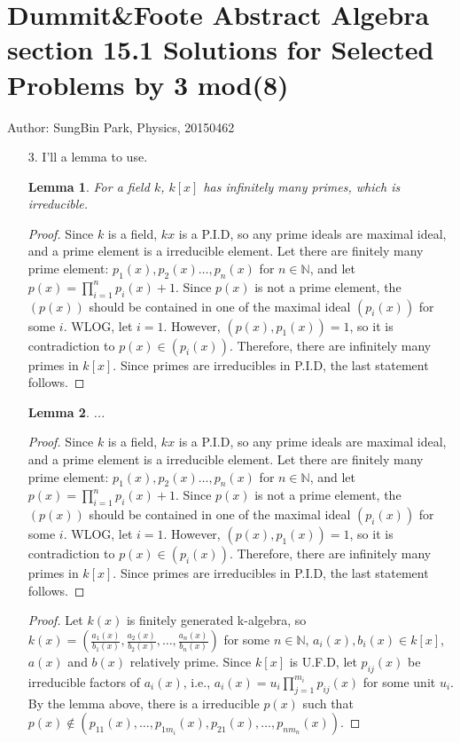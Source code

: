 \documentclass[12pt]{article}
\newtheorem{lemma}{Lemma}
\begin{document}
\section*{Dummit\&Foote Abstract Algebra section 15.1 Solutions for Selected Problems by 3 mod(8)}
Author: SungBin Park, Physics, 20150462
\begin{enumerate}
\item[3.] I'll a lemma to use.
\begin{lemma}
For a field $k$, $k[x]$ has infinitely many primes, which is irreducible.
\end{lemma}
\begin{proof}
Since $k$ is a field, $k{x}$ is a P.I.D, so any prime ideals are maximal ideal, and a prime element is a irreducible element. Let there are finitely many prime element: $p_1(x),p_2(x)\ldots, p_n(x)$ for $n\in \mathbb{N}$, and let $p(x)=\prod_{i=1}^n p_i(x)+1$. Since $p(x)$ is not a prime element, the $(p(x))$ should be contained in one of the maximal ideal $(p_i(x))$ for some $i$. WLOG, let $i=1$. However, $(p(x),p_1(x))=1$, so it is contradiction to $p(x)\in (p_i(x))$. Therefore, there are infinitely many primes in $k[x]$. Since primes are irreducibles in P.I.D, the last statement follows.
\end{proof}
\begin{lemma}
...
\end{lemma}
\begin{proof}
Since $k$ is a field, $k{x}$ is a P.I.D, so any prime ideals are maximal ideal, and a prime element is a irreducible element. Let there are finitely many prime element: $p_1(x),p_2(x)\ldots, p_n(x)$ for $n\in \mathbb{N}$, and let $p(x)=\prod_{i=1}^n p_i(x)+1$. Since $p(x)$ is not a prime element, the $(p(x))$ should be contained in one of the maximal ideal $(p_i(x))$ for some $i$. WLOG, let $i=1$. However, $(p(x),p_1(x))=1$, so it is contradiction to $p(x)\in (p_i(x))$. Therefore, there are infinitely many primes in $k[x]$. Since primes are irreducibles in P.I.D, the last statement follows.
\end{proof}
\begin{proof}
Let $k(x)$ is finitely generated k-algebra, so $k(x)=\left(\frac{a_1(x)}{b_1(x)},\frac{a_2(x)}{b_2(x)},\ldots, \frac{a_n(x)}{b_n(x)}\right)$ for some $n\in \mathbb{N}$, $a_i(x),b_i(x)\in k[x]$, $a(x)$ and $b(x)$ relatively prime. Since $k[x]$ is U.F.D, let $p_{ij}(x)$ be irreducible factors of $a_i(x)$, i.e., $a_i(x)=u_i\prod_{j=1}^{m_i}p_{ij}(x)$ for some unit $u_i$. By the lemma above, there is a irreducible $p(x)$ such that $p(x)\notin (p_{11}(x), \ldots, p_{1m_i}(x),p_{21}(x),\ldots, p_{nm_n}(x))$.


\end{proof}
\end{enumerate}
\end{document}
